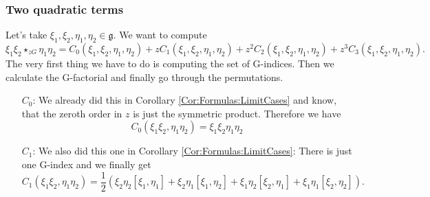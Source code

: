 \subsubsection*{Two quadratic terms}
Let's take $\xi_1, \xi_2, \eta_1, \eta_2 \in \mathfrak{g}$. We want to 
compute
\begin{equation*}
	\xi_1 \xi_2 \star_{zG} \eta_1 \eta_2
	=
	C_0(\xi_1, \xi_2, \eta_1, \eta_2) 
	+ 
	z C_1(\xi_1, \xi_2, \eta_1, \eta_2) 
	+ 
	z^2 C_2(\xi_1, \xi_2, \eta_1, \eta_2) 
	+ 
	z^3 C_3(\xi_1, \xi_2, \eta_1, \eta_2).
\end{equation*}
The very first thing we have to do is computing the set of G-indices. Then we 
calculate the G-factorial and finally go through the permutations.
\begin{itemize}
	\item[$C_0$:]
	We already did this in Corollary \ref{Cor:Formulas:LimitCases} and know, 
	that the zeroth order in $z$ is just the symmetric product. Therefore we 
	have
	\begin{equation*}
		C_0(\xi_1 \xi_2, \eta_1 \eta_2)
		=
		\xi_1 \xi_2 \eta_1 \eta_2
	\end{equation*}
	
	\item[$C_1$:]
	We also did this one in Corollary \ref{Cor:Formulas:LimitCases}: There is 
	just one G-index and we finally get
	\begin{equation*}
		C_1(\xi_1 \xi_2, \eta_1 \eta_2)
		=
		\frac{1}{2} \left(
			\xi_2 \eta_2 [\xi_1, \eta_1] +
			\xi_2 \eta_1 [\xi_1, \eta_2] +
			\xi_1 \eta_2 [\xi_2, \eta_1] +
			\xi_1 \eta_1 [\xi_2, \eta_2]
		\right).
	\end{equation*}
	

\end{itemize}
